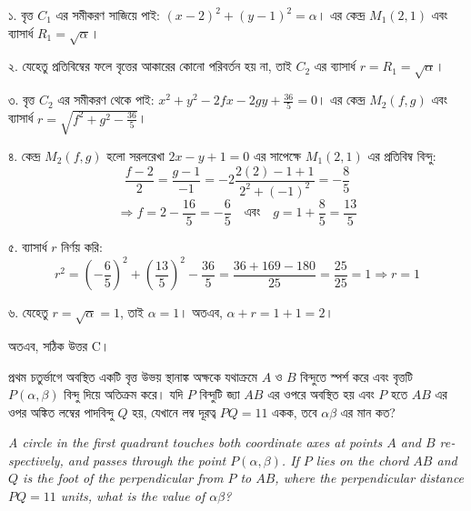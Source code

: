 \documentclass[12pt, a4paper]{article}
\begin{document}
\begin{tcolorbox}[solutionbox={সমাধান (Solution)}]
    \noindent
    ১. বৃত্ত $C_1$ এর সমীকরণ সাজিয়ে পাই: $(x - 2)^2 + (y - 1)^2 = \alpha$। 
    এর কেন্দ্র $M_1(2, 1)$ এবং ব্যাসার্ধ $R_1 = \sqrt{\alpha}$।
    
    \vspace{0.5em}
    ২. যেহেতু প্রতিবিম্বের ফলে বৃত্তের আকারের কোনো পরিবর্তন হয় না, তাই $C_2$ এর ব্যাসার্ধ $r = R_1 = \sqrt{\alpha}$।
    
    \vspace{0.5em}
    ৩. বৃত্ত $C_2$ এর সমীকরণ থেকে পাই: $x^2 + y^2 - 2fx - 2gy + \frac{36}{5} = 0$।
    এর কেন্দ্র $M_2(f, g)$ এবং ব্যাসার্ধ $r = \sqrt{f^2 + g^2 - \frac{36}{5}}$।
    
    \vspace{0.5em}
    ৪. কেন্দ্র $M_2(f, g)$ হলো সরলরেখা $2x - y + 1 = 0$ এর সাপেক্ষে $M_1(2, 1)$ এর প্রতিবিম্ব বিন্দু:
    \[ \frac{f - 2}{2} = \frac{g - 1}{-1} = -2\frac{2(2) - 1 + 1}{2^2 + (-1)^2} = -\frac{8}{5} \]
    \[ \Rightarrow f = 2 - \frac{16}{5} = -\frac{6}{5} \quad \text{এবং} \quad g = 1 + \frac{8}{5} = \frac{13}{5} \]
    
    \vspace{0.5em}
    ৫. ব্যাসার্ধ $r$ নির্ণয় করি:
    \[ r^2 = \left(-\frac{6}{5}\right)^2 + \left(\frac{13}{5}\right)^2 - \frac{36}{5} = \frac{36 + 169 - 180}{25} = \frac{25}{25} = 1 \Rightarrow r = 1 \]
    
    \vspace{0.5em}
    ৬. যেহেতু $r = \sqrt{\alpha} = 1$, তাই $\alpha = 1$। 
    অতএব, $\alpha + r = 1 + 1 = 2$।
    
    \vspace{0.5em}
    অতএব, সঠিক উত্তর C।
\end{tcolorbox}

\vspace{2em}

\begin{tcolorbox}[questionbox={প্রশ্ন (Question) 50}]
    \noindent
    প্রথম চতুর্ভাগে অবস্থিত একটি বৃত্ত উভয় স্থানাঙ্ক অক্ষকে যথাক্রমে $A$ ও $B$ বিন্দুতে স্পর্শ করে এবং বৃত্তটি $P(\alpha, \beta)$ বিন্দু দিয়ে অতিক্রম করে। যদি $P$ বিন্দুটি জ্যা $AB$ এর ওপরে অবস্থিত হয় এবং $P$ হতে $AB$ এর ওপর অঙ্কিত লম্বের পাদবিন্দু $Q$ হয়, যেখানে লম্ব দূরত্ব $PQ = 11$ একক, তবে $\alpha \beta$ এর মান কত?
    
    \vspace{0.8em}
    \begin{english}
    \noindent\textit{\color{darkgray}
    A circle in the first quadrant touches both coordinate axes at points $A$ and $B$ respectively, and passes through the point $P(\alpha, \beta)$. If $P$ lies on the chord $AB$ and $Q$ is the foot of the perpendicular from $P$ to $AB$, where the perpendicular distance $PQ = 11$ units, what is the value of $\alpha \beta$?
    }
    \end{english}
\end{tcolorbox}
\end{document}

